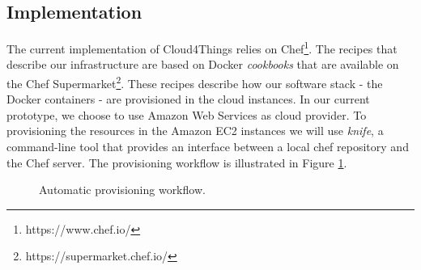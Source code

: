 \subsection{Implementation}
\label{sub:implementation}
The current implementation of Cloud4Things relies on Chef\footnote{https://www.chef.io/}. The recipes that describe our
infrastructure are based on Docker \textit{cookbooks} that are available on the Chef Supermarket\footnote{https://supermarket.chef.io/}.
These recipes describe how our software stack - the Docker containers - are provisioned in the cloud instances.
In our current prototype, we choose to use Amazon Web Services as cloud provider. To provisioning the
resources in the Amazon EC2 instances we will use \textit{knife}, a command-line tool that provides
an interface between a local chef repository and the Chef server. The provisioning workflow is illustrated
in Figure \ref{fig:automatic_provisioning}.
\begin{figure}[!ht]
  \centering
  \caption{Automatic provisioning workflow.}
  \label{fig:automatic_provisioning}
\end{figure}


